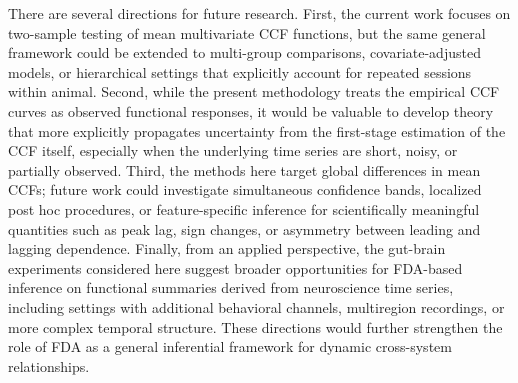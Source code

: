 \documentclass[12pt]{article}
\begin{document}
There are several directions for future research. First, the current work focuses on two-sample testing of mean multivariate CCF functions, but the same general framework could be extended to multi-group comparisons, covariate-adjusted models, or hierarchical settings that explicitly account for repeated sessions within animal. Second, while the present methodology treats the empirical CCF curves as observed functional responses, it would be valuable to develop theory that more explicitly propagates uncertainty from the first-stage estimation of the CCF itself, especially when the underlying time series are short, noisy, or partially observed. Third, the methods here target global differences in mean CCFs; future work could investigate simultaneous confidence bands, localized post hoc procedures, or feature-specific inference for scientifically meaningful quantities such as peak lag, sign changes, or asymmetry between leading and lagging dependence. Finally, from an applied perspective, the gut-brain experiments considered here suggest broader opportunities for FDA-based inference on functional summaries derived from neuroscience time series, including settings with additional behavioral channels, multiregion recordings, or more complex temporal structure. These directions would further strengthen the role of FDA as a general inferential framework for dynamic cross-system relationships.



\end{document}

